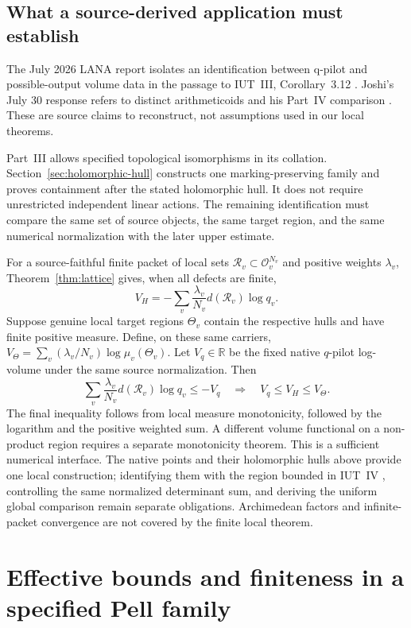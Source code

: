 \documentclass[11pt]{amsart}
\theoremstyle{definition}
\theoremstyle{remark}
\newcommand{\R}{\mathbb R}
\newcommand{\OO}{\mathcal O}
\begin{document}


\subsection{What a source-derived application must establish}
The July 2026 LANA report \cite{LANA} isolates an identification between
q-pilot and possible-output volume data in the passage to IUT~III,
Corollary~3.12 \cite{IUT3}. Joshi's July 30 response \cite{JoshiResponse}
refers to distinct arithmeticoids and his Part~IV comparison
\cite[Theorem~6.10.1]{JoshiIV}. These are source claims to reconstruct,
not assumptions used in our local theorems.

Part~III \cite[Proposition~9.7.5.1]{JoshiIII} allows specified topological
isomorphisms in its collation. Section~\ref{sec:holomorphic-hull} constructs
one marking-preserving family and proves containment after the stated
holomorphic hull. It does not require unrestricted independent linear
actions. The remaining identification must compare the same set of source
objects, the same target region, and the same numerical normalization
with the later upper estimate.

For a source-faithful finite packet of local sets
$\mathcal R_v\subset\OO_v^{N_v}$ and positive weights $\lambda_v$,
Theorem~\ref{thm:lattice} gives, when all defects are finite,
\[
 V_H=-\sum_v\frac{\lambda_v}{N_v}d(\mathcal R_v)\log q_v.
\]
Suppose genuine local target regions $\Theta_v$ contain the respective
hulls and have finite positive measure. Define, on these same carriers,
$V_\Theta=\sum_v(\lambda_v/N_v)\log\mu_v(\Theta_v)$.
Let $V_q\in\R$ be the fixed native $q$-pilot log-volume under the same
source normalization. Then
\[
 \sum_v\frac{\lambda_v}{N_v}d(\mathcal R_v)\log q_v\le -V_q
 \quad\Longrightarrow\quad V_q\le V_H\le V_\Theta.
\]
The final inequality follows from local measure monotonicity, followed by
the logarithm and the positive weighted sum. A different volume functional
on a non-product region requires a separate monotonicity theorem.
This is a sufficient numerical interface. The native points and their
holomorphic hulls above provide one local construction; identifying them
with the region bounded in IUT~IV \cite{IUT4}, controlling the same
normalized determinant sum, and deriving the uniform global comparison
remain separate obligations. Archimedean factors and infinite-packet
convergence are not covered by the finite local theorem.

\section{Effective bounds and finiteness in a specified Pell family}\label{sec:pell}
\end{document}
